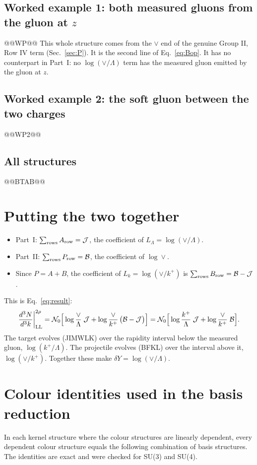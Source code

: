 \documentclass[10pt]{article}
\numberwithin{equation}{section}
\newcommand{\NO}{\mathcal N_0}
\newcommand{\LL}{L_\Lambda}
\newcommand{\Lk}{L_k}
\newcommand{\J}{\mathcal J}
\newcommand{\B}{\mathcal B}
\begin{document}
\subsection{Worked example 1: both measured gluons from the gluon at \texorpdfstring{$z$}{z}}
@@WP@@
This whole structure comes from the $\vee$ end of the genuine Group II, Row IV term (Sec.~\ref{sec:P}). It is the second line of Eq.~\eqref{eq:Bop}. It has no counterpart in Part~I: no $\log(\vee/\Lambda)$ term has the measured gluon emitted by the gluon at $z$.

\subsection{Worked example 2: the soft gluon between the two charges}
@@WP2@@

\subsection{All structures}
@@BTAB@@

\section{Putting the two together}\label{sec:together}
\begin{itemize}
\item Part~I: $\sum_{\rm rows}A_{\rm row}=\J$, the coefficient of $\LL=\log(\vee/\Lambda)$.
\item Part~II: $\sum_{\rm rows}P_{\rm row}=\B$, the coefficient of $\log\vee$.
\item Since $P=A+B$, the coefficient of $\Lk=\log(\vee/k^+)$ is $\sum_{\rm rows}B_{\rm row}=\B-\J$.
\end{itemize}
This is Eq.~\eqref{eq:result}:
\begin{equation*}
\frac{d^3N}{d^3k}\bigg|_{\rm LL}^{2\rho}=\NO\Big[\log\frac{\vee}{\Lambda}\;\J+\log\frac{\vee}{k^+}\,\big(\B-\J\big)\Big]=\NO\Big[\log\frac{k^+}{\Lambda}\;\J+\log\frac{\vee}{k^+}\;\B\Big].
\end{equation*}
The target evolves (JIMWLK) over the rapidity interval below the measured gluon, $\log(k^+/\Lambda)$. The projectile evolves (BFKL) over the interval above it, $\log(\vee/k^+)$. Together these make $\delta Y=\log(\vee/\Lambda)$.

\appendix
\section{Colour identities used in the basis reduction}\label{app:rel}
In each kernel structure where the colour structures are linearly dependent, every dependent colour structure equals the following combination of basis structures. The identities are exact and were checked for SU(3) and SU(4).
\end{document}

